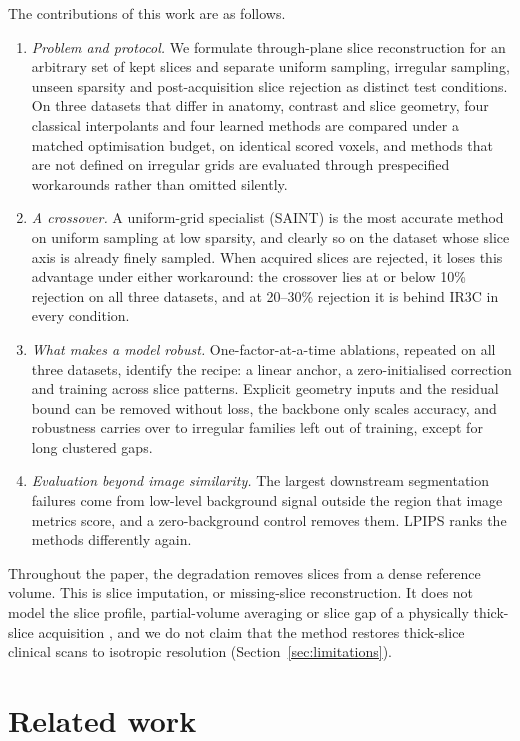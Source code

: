 \documentclass[a4paper,fleqn]{cas-dc}
\begin{document}
The contributions of this work are as follows.
\begin{enumerate}[(1)]
\item \emph{Problem and protocol.} We formulate through-plane slice reconstruction for an
arbitrary set of kept slices and separate uniform sampling, irregular sampling, unseen
sparsity and post-acquisition slice rejection as distinct test conditions. On three datasets
that differ in anatomy, contrast and slice geometry, four classical interpolants and four
learned methods are compared under a matched optimisation budget, on identical scored
voxels, and methods that are not defined on irregular grids are evaluated through
prespecified workarounds rather than omitted silently.
\item \emph{A crossover.} A uniform-grid specialist (SAINT) is the most accurate method on
uniform sampling at low sparsity, and clearly so on the dataset whose slice axis is already
finely sampled. When acquired slices are rejected, it loses this advantage under either
workaround: the crossover lies at or below 10\% rejection on all three datasets, and at
20--30\% rejection it is behind IR3C in every condition.
\item \emph{What makes a model robust.} One-factor-at-a-time ablations, repeated on all
three datasets, identify the recipe: a linear anchor, a zero-initialised correction and
training across slice patterns. Explicit geometry inputs and the residual bound can be
removed without loss, the backbone only scales accuracy, and robustness carries over to
irregular families left out of training, except for long clustered gaps.
\item \emph{Evaluation beyond image similarity.} The largest downstream segmentation
failures come from low-level background signal outside the region that image metrics score,
and a zero-background control removes them. LPIPS ranks the methods differently again.
\end{enumerate}

Throughout the paper, the degradation removes slices from a dense reference volume. This is
slice imputation, or missing-slice reconstruction. It does not model the slice profile,
partial-volume averaging or slice gap of a physically thick-slice acquisition
\citep{remedios2026eclare}, and we do not claim that the method restores thick-slice clinical
scans to isotropic resolution (Section~\ref{sec:limitations}).

\section{Related work}
\label{sec:related}
\end{document}
